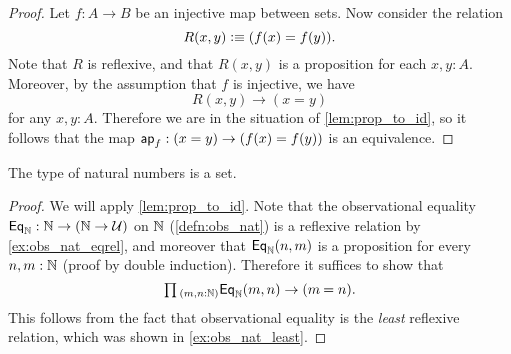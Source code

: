 \begin{proof}
  Let $f:A\to B$ be an injective map between sets. Now consider the relation
  \begin{equation*}
    R(x,y)\vcentcolon\equiv (f(x)=f(y)).
  \end{equation*}
  Note that $R$ is reflexive, and that $R(x,y)$ is a proposition for each $x,y:A$. Moreover, by the assumption that $f$ is injective, we have
  \begin{equation*}
    R(x,y)\to (x=y)
  \end{equation*}
  for any $x,y:A$. Therefore we are in the situation of \cref{lem:prop_to_id}, so it follows that the map $\mathsf{ap}_{f} : (x=y)\to (f(x)=f(y))$ is an equivalence.
\end{proof}

\begin{thm}\label{thm:eq_nat}
The type of natural numbers is a set.
\end{thm}

\begin{proof}
We will apply \cref{lem:prop_to_id}. Note that the observational equality $\mathsf{Eq}_{{\mathbb{N}}}:{\mathbb{N}}\to({\mathbb{N}}\to\mathcal{U})$ on ${\mathbb{N}}$ (\cref{defn:obs_nat}) is a reflexive relation by \cref{ex:obs_nat_eqrel}, and moreover that $\mathsf{Eq}_{{\mathbb{N}}}(n,m)$ is a proposition for every $n,m:{\mathbb{N}}$ (proof by double induction).
Therefore it suffices to show that
\begin{equation*}
\prd{m,n:\N}\EqN(m,n)\to (\id{m}{n}).
\end{equation*}
This follows from the fact that observational equality is the \emph{least} reflexive relation, which was shown in \cref{ex:obs_nat_least}.
\end{proof}


